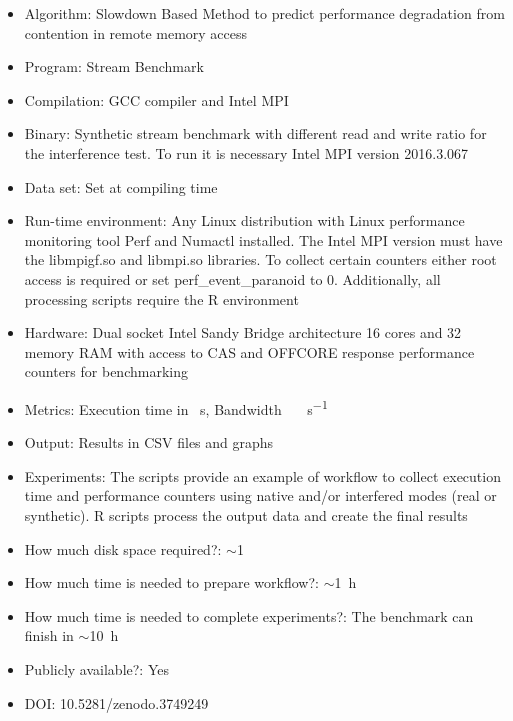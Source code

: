 \documentclass{sigplanconf}
\begin{document}
	\begin{itemize} 
		
		\item Algorithm: Slowdown Based Method to predict performance degradation from
		contention in remote memory access
		
		\item Program: Stream Benchmark
		
		\item Compilation: GCC compiler and Intel MPI 
		
		\item Binary: Synthetic stream benchmark with different read and write ratio for the
		interference test. To run it is necessary Intel MPI version 2016.3.067 
		
		\item Data set: Set at compiling time 
		
		\item Run-time environment: Any Linux distribution with Linux performance monitoring
		tool \textsf{Perf} and \textsf{Numactl} installed. The Intel MPI version must have the \textsf{libmpigf.so} and \textsf{libmpi.so} libraries. To collect certain counters either root access is
		required or set \textsf{perf\_event\_paranoid} to 0. Additionally, all processing
		scripts require the R environment  
		
		\item Hardware: Dual socket Intel Sandy Bridge architecture 16 cores and
		\SI{32}{\giga\byte} memory RAM with access to CAS and OFFCORE response performance
		counters for benchmarking
		
		\item Metrics: Execution time in \SI{}{\second}, Bandwidth
		\SI{}{\giga\byte\per\second}
		
		\item Output: Results in CSV files and graphs 
		
		\item Experiments: The scripts provide an example of workflow to collect execution
		time and performance counters using native and/or interfered modes (real or
		synthetic). R scripts process the output data and create the final results 
		
		\item How much disk space required?: $\sim$\SI{1}{\giga\byte} 
		
		\item How much time is needed to prepare workflow?: $\sim$\SI{1}{\hour}
		
		\item How much time is needed to complete experiments?: The benchmark can finish in
		$\sim$\SI{10}{\hour}
		
		\item Publicly available?: Yes
		
		\item DOI: 10.5281/zenodo.3749249
		
	\end{itemize}
	
\end{document}
